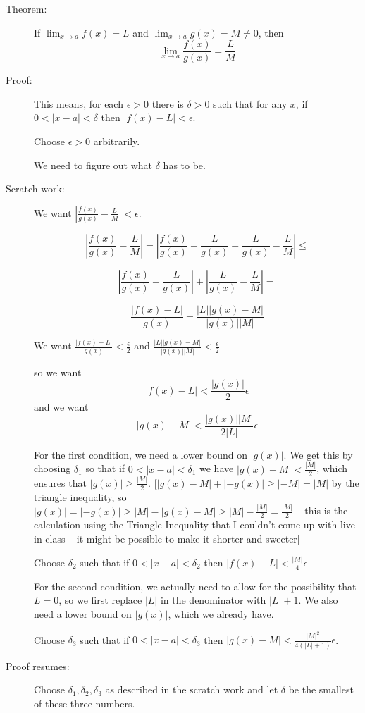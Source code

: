 \documentclass[12pt]{article}
\begin{document}
\begin{description}

\item[Theorem:]  If $\lim_{x\rightarrow a}f(x)=L$ and $\lim_{x \rightarrow a}g(x)=M \neq 0$, then $$\lim_{x \rightarrow a}\frac{f(x)}{g(x)}=\frac LM$$

\item[Proof:]  This means, for each $\epsilon>0$ there is $\delta>0$ such that for any $x$, if $0<|x-a|<\delta$ then $|f(x)-L|<\epsilon$.

Choose $\epsilon>0$ arbitrarily.

We need to figure out what $\delta$ has to be.

\item[Scratch work:]  We want $|\frac{f(x)}{g(x)}-\frac LM|<\epsilon$.

$$\left|\frac{f(x)}{g(x)}-\frac LM\right|=\left|\frac{f(x)}{g(x)}-\frac L{g(x)}+\frac L{g(x)}-\frac LM\right|\leq $$

$$\left|\frac{f(x)}{g(x)}-\frac L{g(x)}\right|+\left|\frac L{g(x)}-\frac LM\right|=$$

$$ \frac{|f(x)- L|}{g(x)} + \frac{|L||g(x)-M|}{|g(x)||M|}$$


We want  $\frac{|f(x)- L|}{g(x)}<\frac\epsilon2$  and $\frac{|L||g(x)-M|}{|g(x)||M|}<\frac{\epsilon}2$

so we want $$|f(x)-L|<\frac{|g(x)|}2\epsilon$$  and we want $$|g(x)-M|<\frac{|g(x)||M|}{2|L|}\epsilon$$

For the first condition, we need a lower bound on $|g(x)|$.   We get this by choosing $\delta_1$ so that if $0<|x-a|<\delta_1$ we have $|g(x)-M|<\frac{|M|}2$, which ensures
that $|g(x)| \geq \frac{|M|}2$.  [$|g(x)-M| + |-g(x)| \geq |-M|=|M|$ by the triangle inequality, so $|g(x)|=|-g(x)| \geq |M|-|g(x)-M| \geq |M|-\frac{|M|}2=\frac{|M|}2$ -- this is the calculation using the Triangle Inequality that I couldn't come up with live in class -- it might be possible to make it shorter and sweeter]

Choose $\delta_2$ such that if $0<|x-a|<\delta_2$ then $|f(x)-L|<\frac{|M|}4\epsilon$

For the second condition, we actually need to allow for the possibility that $L=0$, so we first replace $|L|$ in the denominator with $|L|+1$.  We also need a lower bound
on $|g(x)|$, which we already have.

Choose $\delta_3$ such that if $0<|x-a|<\delta_3$ then $|g(x)-M|<\frac{|M|^2}{4(|L|+1)}\epsilon$.

\item[Proof resumes:]   Choose $\delta_1, \delta_2, \delta_3$ as described in the scratch work and let $\delta$ be the smallest of these three numbers.


\end{description}
\end{document}
